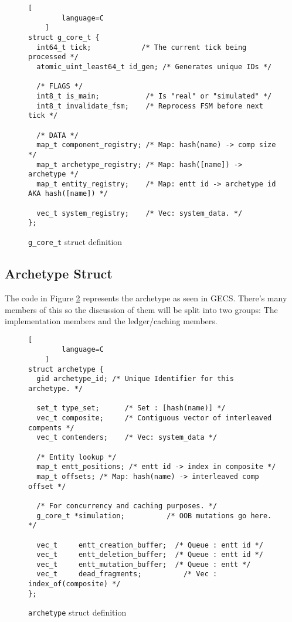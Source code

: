 \begin{figure}[htbp]
    \begin{lstlisting}[
        language=C
    ]
struct g_core_t {
  int64_t tick;            /* The current tick being processed */
  atomic_uint_least64_t id_gen; /* Generates unique IDs */
    
  /* FLAGS */
  int8_t is_main;           /* Is "real" or "simulated" */
  int8_t invalidate_fsm;    /* Reprocess FSM before next tick */

  /* DATA */
  map_t component_registry; /* Map: hash(name) -> comp size */
  map_t archetype_registry; /* Map: hash([name]) -> archetype */
  map_t entity_registry;    /* Map: entt id -> archetype id AKA hash([name]) */
    
  vec_t system_registry;    /* Vec: system_data. */
};
    \end{lstlisting}
    \caption{\texttt{g\_core\_t} struct definition}
    \label{code:g_core_t}
\end{figure}

\subsection{Archetype Struct}
The code in Figure \ref{code:archetype} represents the archetype as seen in GECS. There's many members of this so the discussion of them will be split into two groups: The implementation members and the ledger/caching members. 

\begin{figure}[H]
    \begin{lstlisting}[
        language=C
    ]
struct archetype {
  gid archetype_id; /* Unique Identifier for this archetype. */
  
  set_t type_set;      /* Set : [hash(name)] */
  vec_t composite;     /* Contiguous vector of interleaved compents */
  vec_t contenders;    /* Vec: system_data */
  
  /* Entity lookup */
  map_t entt_positions; /* entt id -> index in composite */
  map_t offsets; /* Map: hash(name) -> interleaved comp offset */
  
  /* For concurrency and caching purposes. */
  g_core_t *simulation;          /* OOB mutations go here. */
  
  vec_t     entt_creation_buffer;  /* Queue : entt id */
  vec_t     entt_deletion_buffer;  /* Queue : entt id */
  vec_t     entt_mutation_buffer;  /* Queue : entt */
  vec_t     dead_fragments;          /* Vec : index_of(composite) */
};
    \end{lstlisting}
    \caption{\texttt{archetype} struct definition}
    \label{code:archetype}
\end{figure}


